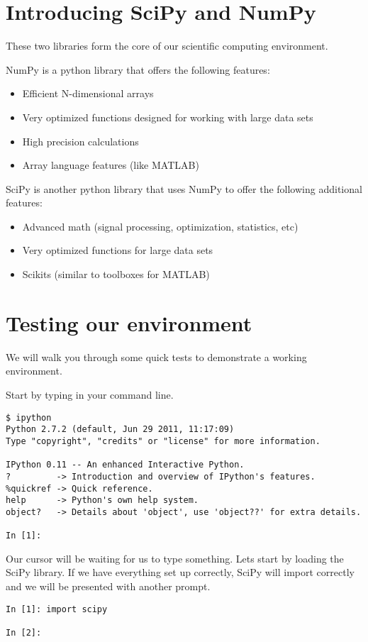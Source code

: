 \section*{Introducing SciPy and NumPy}
These two libraries form the core of our scientific computing environment.

NumPy is a python library that offers the following features:
\begin{itemize}
\item Efficient N-dimensional arrays
\item Very optimized functions designed for working with large data sets
\item High precision calculations
\item Array language features (like MATLAB)
\end{itemize}

SciPy is another python library that uses NumPy to offer the following additional features:
\begin{itemize}
\item Advanced math (signal processing, optimization, statistics, etc)
\item Very optimized functions for large data sets
\item Scikits (similar to toolboxes for MATLAB)
\end{itemize}

\section*{Testing our environment}
We will walk you through some quick tests to demonstrate a working environment.

Start by typing  in your command line.
\begin{lstlisting}
$ ipython
Python 2.7.2 (default, Jun 29 2011, 11:17:09) 
Type "copyright", "credits" or "license" for more information.

IPython 0.11 -- An enhanced Interactive Python.
?         -> Introduction and overview of IPython's features.
%quickref -> Quick reference.
help      -> Python's own help system.
object?   -> Details about 'object', use 'object??' for extra details.

In [1]: 
\end{lstlisting}

Our cursor will be waiting for us to type something.  Lets start by loading the SciPy library.  If we have everything set up correctly, SciPy will import correctly and we will be presented with another prompt.
\begin{lstlisting}[style=python]
In [1]: import scipy

In [2]:
\end{lstlisting}

